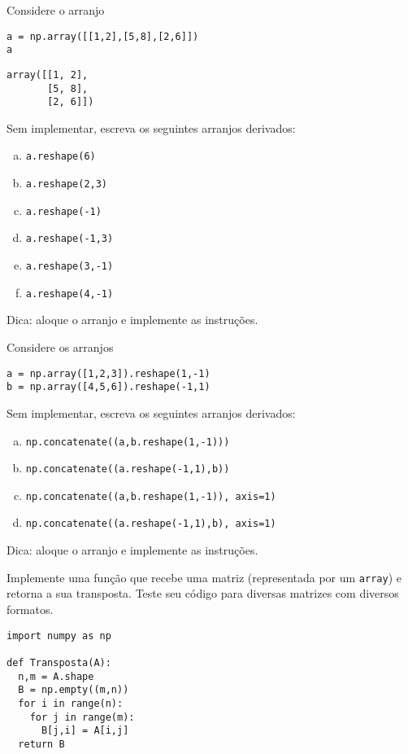 \begin{exer}
  Considere o arranjo

\begin{lstlisting}
a = np.array([[1,2],[5,8],[2,6]])
a
\end{lstlisting}

\begin{verbatim}
array([[1, 2],
       [5, 8],
       [2, 6]])
\end{verbatim}

Sem implementar, escreva os seguintes arranjos derivados:
  \begin{enumerate}[a)]
  \item \lstinline+a.reshape(6)+
  \item \lstinline+a.reshape(2,3)+
  \item \lstinline+a.reshape(-1)+
  \item \lstinline+a.reshape(-1,3)+
  \item \lstinline+a.reshape(3,-1)+
  \item \lstinline+a.reshape(4,-1)+
  \end{enumerate}
\end{exer}
\begin{resp}
  Dica: aloque o arranjo e implemente as instruções.
\end{resp}

\begin{exer}
  Considere os arranjos

\begin{lstlisting}
a = np.array([1,2,3]).reshape(1,-1)
b = np.array([4,5,6]).reshape(-1,1)
\end{lstlisting}

Sem implementar, escreva os seguintes arranjos derivados:
  \begin{enumerate}[a)]
  \item \lstinline+np.concatenate((a,b.reshape(1,-1)))+
  \item \lstinline+np.concatenate((a.reshape(-1,1),b))+
  \item \lstinline+np.concatenate((a,b.reshape(1,-1)), axis=1)+
  \item \lstinline+np.concatenate((a.reshape(-1,1),b), axis=1)+
  \end{enumerate}
\end{exer}
\begin{resp}
  Dica: aloque o arranjo e implemente as instruções.
\end{resp}

\begin{exer}
  Implemente uma função que recebe uma matriz (representada por um \lstinline+array+) e retorna a sua transposta. Teste seu código para diversas matrizes com diversos formatos.
\end{exer}
\begin{resp}

\begin{lstlisting}
import numpy as np

def Transposta(A):
  n,m = A.shape
  B = np.empty((m,n))
  for i in range(n):
    for j in range(m):
      B[j,i] = A[i,j]
  return B
\end{lstlisting}

\end{resp}

